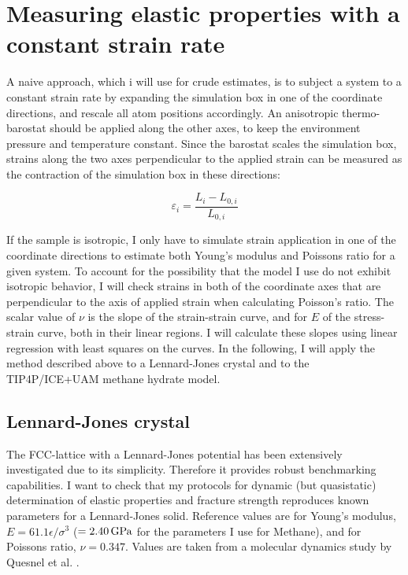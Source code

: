\section{Measuring elastic properties with a constant strain rate}
A naive approach, which i will use for crude estimates, is to subject a system to a constant strain rate by expanding the simulation box in one of the coordinate directions, and rescale all atom positions accordingly. An anisotropic thermo-barostat should be applied along the other axes, to keep the environment pressure and temperature constant. Since the barostat scales the simulation box, strains along the two axes perpendicular to the applied strain can be measured as the contraction of the simulation box in these directions:

\begin{equation}
\varepsilon_i = \frac{L_i-L_{0, i}}{L_{0, i}}
\end{equation}

If the sample is isotropic, I only have to simulate strain application in one of the coordinate directions to estimate both Young's modulus and Poissons ratio for a given system. To account for the possibility that the model I use do not exhibit isotropic behavior, I will check strains in both of the coordinate axes that are perpendicular to the axis of applied strain when calculating Poisson's ratio. The scalar value of $\nu$ is the slope of the strain-strain curve, and for $E$ of the stress-strain curve, both in their linear regions. I will calculate these slopes using linear regression with least squares on the curves.
In the following, I will apply the method described above to a Lennard-Jones crystal and to the TIP4P/ICE+UAM methane hydrate model.

\subsection{Lennard-Jones crystal}
The FCC-lattice with a Lennard-Jones potential has been extensively investigated due to its simplicity. Therefore it provides robust benchmarking capabilities. I want to check that my protocols for dynamic (but quasistatic) determination of elastic properties and fracture strength reproduces known parameters for a Lennard-Jones solid. Reference values are for Young's modulus, $E=61.1 \epsilon/\sigma^3$ ($ = \text{\SI{2.40}{\giga\pascal}}$ for the parameters I use for Methane), and for Poissons ratio, $\nu=0.347$. Values are taken from a molecular dynamics study by Quesnel et al. \cite{Quesnel1993}.

